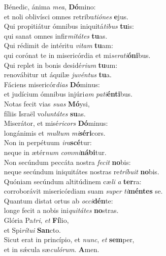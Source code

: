 \evenverse Bénedic, ánima \textit{me}\textit{a}, \textbf{Dó}mino:~\*\\
\evenverse et noli oblivísci omnes retribu\textit{ti}\textit{ó}\textit{nes} \textbf{e}jus.\\
\oddverse Qui propitiátur ómnibus iniquitá\textit{ti}\textit{bus} \textbf{tu}is:~\*\\
\oddverse qui sanat omnes infir\textit{mi}\textit{tá}\textit{tes} \textbf{tu}as.\\
\evenverse Qui rédimit de intéritu \textit{vi}\textit{tam} \textbf{tu}am:~\*\\
\evenverse qui corónat te in misericórdia et mi\textit{se}\textit{ra}\textit{ti}\textbf{ó}\textbf{ni}bus.\\
\oddverse Qui replet in bonis desidé\textit{ri}\textit{um} \textbf{tu}um:~\*\\
\oddverse renovábitur ut áquilæ \textit{ju}\textit{vén}\textit{tus} \textbf{tu}a.\\
\evenverse Fáciens misericór\textit{di}\textit{as} \textbf{Dó}minus:~\*\\
\evenverse et judícium ómnibus injúri\textit{am} \textit{pa}\textit{ti}\textbf{én}\textbf{ti}bus.\\
\oddverse Notas fecit vias \textit{su}\textit{as} \textbf{Mó}ysi,~\*\\
\oddverse fíliis Israël vo\textit{lun}\textit{tá}\textit{tes} \textbf{su}as.\\
\evenverse Miserátor, et misé\textit{ri}\textit{cors} \textbf{Dó}minus:~\*\\
\evenverse longánimis et \textit{mul}\textit{tum} \textit{mi}\textbf{sé}\textbf{ri}cors.\\
\oddverse Non in perpétuum \textit{i}\textit{ra}\textbf{scé}tur:~\*\\
\oddverse neque in ætér\textit{num} \textit{com}\textit{mi}\textbf{ná}\textbf{bi}tur.\\
\evenverse Non secúndum peccáta nostra \textit{fe}\textit{cit} \textbf{no}bis:~\*\\
\evenverse neque secúndum iniquitátes nostras re\textit{trí}\textit{bu}\textit{it} \textbf{no}bis.\\
\oddverse Quóniam secúndum altitúdinem cæ\textit{li} \textit{a} \textbf{ter}ra:~\*\\
\oddverse corroborávit misericórdiam suam \textit{su}\textit{per} \textit{ti}\textbf{mén}\textbf{tes} se.\\
\evenverse Quantum distat ortus ab \textit{oc}\textit{ci}\textbf{dén}te:~\*\\
\evenverse longe fecit a nobis ini\textit{qui}\textit{tá}\textit{tes} \textbf{no}stras.\\
\oddverse Glória Pa\textit{tri}, \textit{et} \textbf{Fí}lio,~\*\\
\oddverse et Spi\textit{rí}\textit{tu}\textit{i} \textbf{San}cto.\\
\evenverse Sicut erat in princípio, et \textit{nunc}, \textit{et} \textbf{sem}per,~\*\\
\evenverse et in sǽcula sæ\textit{cu}\textit{ló}\textit{rum}. \textbf{A}men.\\
